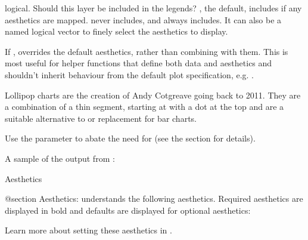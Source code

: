 \documentclass[a4paper]{book}
\begin{document}
\begin{Arguments}
\begin{ldescription}
\item[\code{show.legend}] logical. Should this layer be included in the legends?
, the default, includes if any aesthetics are mapped.
 never includes, and  always includes.
It can also be a named logical vector to finely select the aesthetics to
display.

\item[\code{inherit.aes}] If , overrides the default aesthetics,
rather than combining with them. This is most useful for helper functions
that define both data and aesthetics and shouldn't inherit behaviour from
the default plot specification, e.g. .
\end{ldescription}
\end{Arguments}
%
\begin{Details}
Lollipop charts are the creation of Andy Cotgreave going back to 2011. They
are a combination of a thin segment, starting at with a dot at the top and are a
suitable alternative to or replacement for bar charts.

Use the  parameter to abate the need for 
(see the  section for details).




A sample of the output from :


\end{Details}
%
\begin{Section}{Aesthetics}

@section Aesthetics:
understands the following aesthetics. Required aesthetics are displayed in bold and defaults are displayed for optional aesthetics:

Learn more about setting these aesthetics in .
\end{Section}
\end{document}
